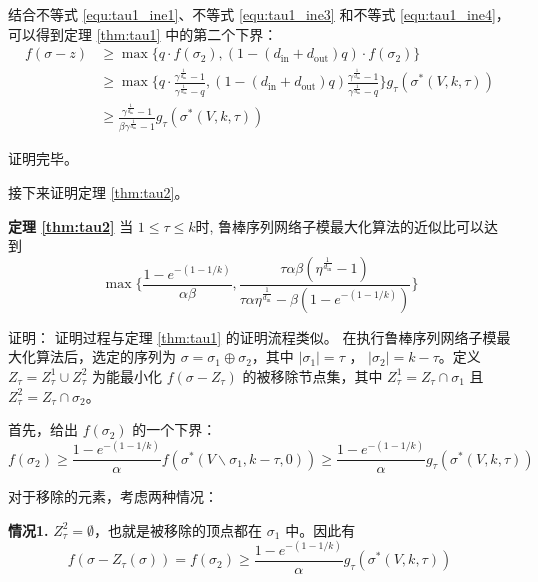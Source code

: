结合不等式 \ref{equ:tau1_ine1}、不等式 \ref{equ:tau1_ine3} 和不等式 \ref{equ:tau1_ine4}，可以得到定理 \ref{thm:tau1} 中的第二个下界：
\begin{align}
     f(\sigma -z ) & \ge \max\{ q \cdot f(\sigma_2),(1-(d_{\text{in}} + d_{\text{out}})q) \cdot f(\sigma_2)\} \\
    & \ge \max\{ q \cdot \frac{\gamma^{\frac{1}{d_{\text{in}}}}-1}{\gamma^{\frac{1}{d_{\text{in}}}}-q} , (1-(d_{\text{in}} + d_{\text{out}})q) \frac{\gamma^{\frac{1}{d_{\text{in}}}}-1}{\gamma^{\frac{1}{d_{\text{in}}}}-q} \} g_\tau(\sigma^*(V,k,\tau)) \\
    & \ge \frac{\gamma^{\frac{1}{d_{\text{in}}}}-1}{\beta \gamma^{\frac{1}{d_{\text{in}}}}-1} g_\tau(\sigma^*(V,k,\tau))
\end{align}

\noindent 证明完毕。


接下来证明定理 \ref{thm:tau2}。

\noindent \textbf{定理 \ref{thm:tau2}} 当 $1\le \tau \le k$时, 鲁棒序列网络子模最大化算法的近似比可以达到
\begin{equation*}
 \max\{\frac{1-e^{-(1-1/k)}}{\alpha\beta},\frac{\tau\alpha\beta(\eta^{\frac{1}{d_{\text{in}}}}-1)}{\tau\alpha\eta^{\frac{1}{d_{\text{in}}}}- \beta (1-e^{-(1-1/k)}) }\}   
\end{equation*}

\noindent 证明：
证明过程与定理 \ref{thm:tau1} 的证明流程类似。
在执行鲁棒序列网络子模最大化算法后，选定的序列为 $\sigma=\sigma_1 \oplus \sigma_2$，其中 $|\sigma_1|=\tau$ ， $|\sigma_2|=k-\tau$。定义 $Z_{\tau} = Z_{\tau}^1 \cup Z_{\tau}^2$ 为能最小化 $f(\sigma-Z_{\tau})$ 的被移除节点集，其中 $Z_{\tau}^1 = Z_{\tau} \cap \sigma_1$ 且 $Z_{\tau}^2 = Z_{\tau} \cap \sigma_2$。

首先，给出 $f(\sigma_2)$ 的一个下界：
\begin{equation}
    f(\sigma_2) \ge \frac{1-e^{-(1-1/k)}}{\alpha} f(\sigma^*(V\backslash \sigma_1,k-\tau,0)) \ge \frac{1-e^{-(1-1/k)}}{\alpha} g_\tau(\sigma^*(V,k,\tau)) \label{equ:tau2_line1}
\end{equation}

对于移除的元素，考虑两种情况：

\textbf{情况1.} $Z^2_{\tau}=\emptyset$，也就是被移除的顶点都在 $\sigma_1$ 中。因此有
\begin{equation}
    f(\sigma-Z_\tau(\sigma))=f(\sigma_2) \ge \frac{1-e^{-(1-1/k)}}{\alpha} g_\tau(\sigma^*(V,k,\tau))
\end{equation}

